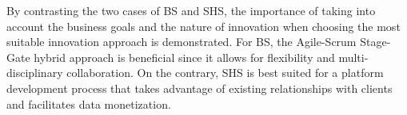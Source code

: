 \documentclass[a4paper,10pt,UTF8]{scrartcl}
\begin{document}
By contrasting the two cases of BS and SHS, the importance of taking into account the business goals and the nature of innovation when choosing the most suitable innovation approach is demonstrated. For BS, the Agile-Scrum Stage-Gate hybrid approach is beneficial since it allows for flexibility and multi-disciplinary collaboration. On the contrary, SHS is best suited for a platform development process that takes advantage of existing relationships with clients and facilitates data monetization.









\end{document}
